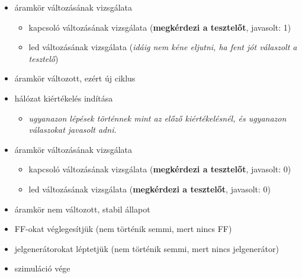 {\begin{itemize}
\begin{itemize}
\begin{itemize}
\begin{itemize}
	\setlength{\itemsep}{0cm}%
	\setlength{\parskip}{0cm}%
		\item led bemenetének lekérdezése (\textbf{megkérdezi a tesztelőt}, javasolt: 1)
	\end{itemize}
\end{itemize}
\item áramkör változásának vizsgálata
\begin{itemize}
\setlength{\itemsep}{0cm}%
\setlength{\parskip}{0cm}%
	\item kapcsoló változásának vizsgálata (\textbf{megkérdezi a tesztelőt}, javasolt: 1)
	\item led változásának vizsgálata (\textit{idáig nem kéne eljutni, ha fent jót válaszolt a tesztelő})
\end{itemize}
\item áramkör változott, ezért új ciklus
\item hálózat kiértékelés indítása
\begin{itemize}
\setlength{\itemsep}{0cm}%
\setlength{\parskip}{0cm}%
	\item \textit{ugyanazon lépések történnek mint az előző kiértékelésnél, és ugyanazon válaszokat javasolt adni.}
\end{itemize}
\item áramkör változásának vizsgálata
\begin{itemize}
\setlength{\itemsep}{0cm}%
\setlength{\parskip}{0cm}%
	\item kapcsoló változásának vizsgálata (\textbf{megkérdezi a tesztelőt}, javasolt: 0)
	\item led változásának vizsgálata (\textbf{megkérdezi a tesztelőt}, javasolt: 0)
\end{itemize}
\item áramkör nem változott, stabil állapot
\item FF-okat véglegesítjük (nem történik semmi, mert nincs FF)
\item jelgenerátorokat léptetjük (nem történik semmi, mert nincs jelgenerátor)
\item szimuláció vége
\end{itemize}
\end{itemize}
\vspace{-15pt}}

\newpage

